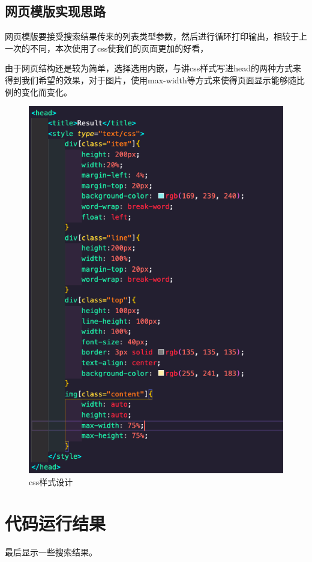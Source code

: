 \documentclass[UTF8]{ctexart}
\begin{document}
        \subsection{网页模版实现思路}
            网页模版要接受搜索结果传来的列表类型参数，然后进行循环打印输出，相较于上一次的不同，本次使用了css使我们的页面更加的好看，

            由于网页结构还是较为简单，选择选用内嵌，与讲css样式写进head的两种方式来得到我们希望的效果，对于图片，使用max-width等方式来使得页面显示能够随比例的变化而变化。
            \begin{figure}[ht]
                \centering
                \includegraphics[scale=0.4]{img/css.png}
                \caption{css样式设计}
            \end{figure}
    \section{代码运行结果}
        最后显示一些搜索结果。
\end{document}
